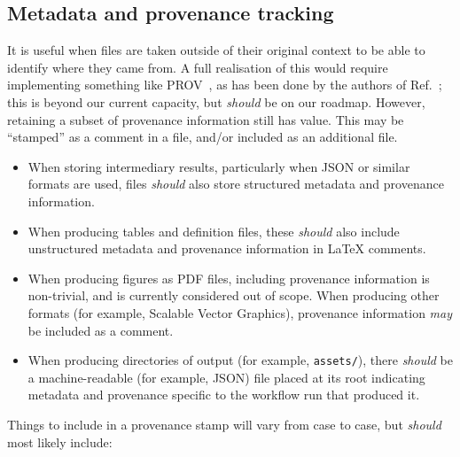 \documentclass{article}
\newcommand\rfcword[1]{\emph{#1}\xspace}
\newcommand\should{\rfcword{should}}
\newcommand\may{\rfcword{may}}
\newcommand\filename[1]{\texttt{#1}\xspace}
\begin{document}
\subsection{Metadata and provenance tracking}

It is useful
when files are taken outside of their original context
to be able to identify where they came from.
A full realisation of this would require implementing something like PROV~\cite{prov},
as has been done by the authors of Ref.~\cite{Auge:2023vnd};
this is beyond our current capacity,
but \should be on our roadmap.
However,
retaining a subset of provenance information still has value.
This may be ``stamped'' as a comment in a file,
and/or included as an additional file.

\begin{itemize}
  \item
        When storing intermediary results,
        particularly when JSON or similar formats are used,
        files \should also store structured metadata and provenance information.
  \item
        When producing tables and definition files,
        these \should also include
        unstructured metadata and provenance information
        in LaTeX comments.
  \item
        When producing figures as PDF files,
        including provenance information is non-trivial,
        and is currently considered out of scope.
        When producing other formats
        (for example, Scalable Vector Graphics),
        provenance information \may be included as a comment.
  \item
        When producing directories of output
        (for example, \filename{assets/}),
        there \should be a machine-readable
        (for example, JSON)
        file placed at its root
        indicating metadata and provenance specific to the workflow run that produced it.
\end{itemize}

Things to include in a provenance stamp will vary from case to case,
but \should most likely include:
\end{document}
